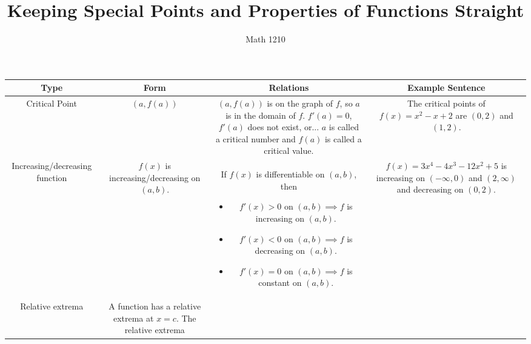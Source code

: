 \documentclass[12pt, landscape]{article}
\author{Math 1210}
\title{Keeping Special Points and Properties of Functions Straight}
\date{}
\theoremstyle{mainstyle} %
\theoremstyle{longstyle}
\begin{document}
\maketitle
\begin{tabular}{c|c|c|c}
  Type
  &Form
  &Relations
  &Example Sentence \\
  \hline
  Critical Point
  &\((a,f(a))\)
  &\parbox{9cm}{\((a,f(a))\) is on the graph of
    \(f\), so \(a\) is in the domain of
    \(f\). \\
  \(f'(a) = 0\), \(f'(a)\) does not exist, or...\\
  \(a\) is called a critical number and \(f(a)\) is called a critical value.}
  &\parbox{5cm}{The critical points of \(f(x) = x^2-x+2\) are
    \((0,2)\) and \((1,2)\).} \\
  \hline
  Increasing/decreasing function
  & \parbox{4cm}{\(f(x)\) is increasing/decreasing on \((a,b)\).}
  & \parbox{9cm}{If \(f(x)\) is differentiable on \((a,b)\), then
    \begin{itemize}
    \item \(f'(x) > 0\) on \((a,b) \implies f\) is increasing on \((a,b)\).
    \item \(f'(x) < 0\) on \((a,b) \implies f\) is decreasing on \((a,b)\).
    \item \(f'(x) = 0\) on \((a,b) \implies f\) is constant on \((a,b)\).
    \end{itemize}
    }
  & \parbox{5cm}{\(f(x) = 3x^4 - 4x^3 - 12x^2 + 5\) is increasing on
    \((-\infty, 0)\) and \((2,\infty)\) and decreasing on \((0,2)\).} \\
  \hline
  Relative extrema
  & \parbox{4cm}{A function has a relative extrema at \(x=c\). The
    relative extrema } 
\end{tabular}
\end{document}
